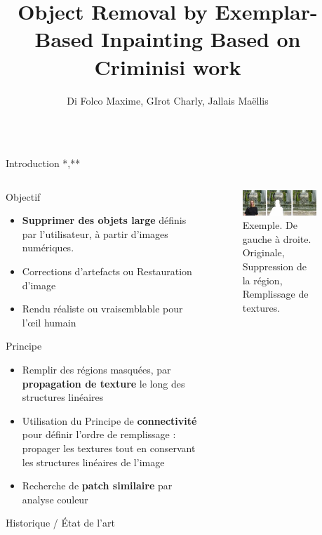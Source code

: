 \documentclass[final,hyperref={pdfpagelabels=false}]{beamer}
\title{\huge  Object Removal by Exemplar-Based Inpainting \small Based on Criminisi work}
\author{Di Folco Maxime, GIrot Charly, Jallais Maëllis}
\institute{Ecole Supérieure de Chimie Physique Électronique de Lyon}
\begin{document}
\begin{frame}[t]

\begin{columns}[t]
\begin{column}{.02\textwidth} \end{column}
\begin{column}{.930\textwidth} 
\begin{block}{Introduction *,**}
\begin{columns}[t]
\begin{column}{.496\textwidth}
Objectif
\begin{itemize} 
\item \textbf{Supprimer des objets large} définis par l'utilisateur, à partir d'images numériques. 
\item Corrections d'artefacts ou Restauration d'image
\item Rendu réaliste ou vraisemblable pour l'œil humain
\end{itemize}
Principe
\begin{itemize} 
\item Remplir des régions masquées, par \textbf{propagation de texture} le long des structures linéaires 
\item Utilisation du Principe de \textbf{connectivité} pour définir l'ordre de remplissage : propager les textures tout en conservant les structures linéaires de l'image
\item Recherche de \textbf{patch similaire} par analyse couleur
\end{itemize}

Historique / État de l'art 

 


\end{column}
\begin{column}{.496\textwidth}
\begin{figure}[!b]
\includegraphics[width=0.8\linewidth]{inpaintingex.jpeg}
\caption{Exemple. De gauche à droite. Originale, Suppression de la région, Remplissage de textures. }
\label{example}
\end{figure}
\end{column}
\end{columns}
\end{block}
\end{column}



\end{columns}
\end{frame}
\end{document}
